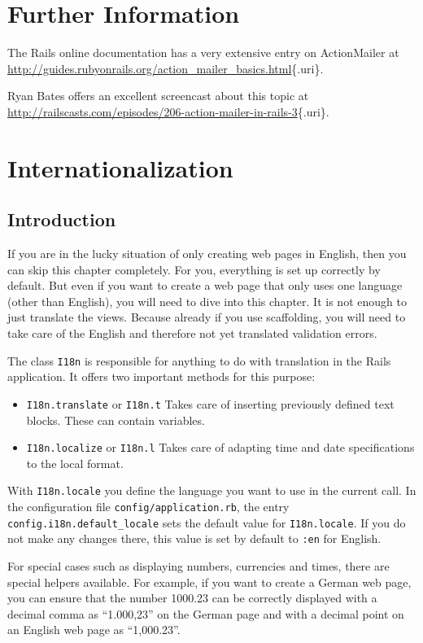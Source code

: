 \documentclass[a4paper]{book}
\newcommand{\chap}[1]{\newpage\thispagestyle{empty}\chapter{#1}\label{chap:\thechapter}}
\begin{document}
\chap{Further Information}\label{further-information}

The Rails online documentation has a very extensive entry on ActionMailer at \url{http://guides.rubyonrails.org/action_mailer_basics.html}\{.uri\}.

Ryan Bates offers an excellent screencast about this topic at \url{http://railscasts.com/episodes/206-action-mailer-in-rails-3}\{.uri\}.

\chap{Internationalization}\label{internationalization}

\section{Introduction}\label{introduction-4}

If you are in the lucky situation of only creating web pages in English, then you can skip this chapter completely. For you, everything is set up correctly by default. But even if you want to create a web page that only uses one language (other than English), you will need to dive into this chapter. It is not enough to just translate the views. Because already if you use scaffolding, you will need to take care of the English and therefore not yet translated validation errors.

The class \texttt{I18n} is responsible for anything to do with translation in the Rails application. It offers two important methods for this purpose:

\begin{itemize}
\itemsep1pt\parskip0pt
\item
  \texttt{I18n.translate} or \texttt{I18n.t} Takes care of inserting previously defined text blocks. These can contain variables.
\item
  \texttt{I18n.localize} or \texttt{I18n.l} Takes care of adapting time and date specifications to the local format.
\end{itemize}

With \texttt{I18n.locale} you define the language you want to use in the current call. In the configuration file \texttt{config/application.rb}, the entry \texttt{config.i18n.default\_locale} sets the default value for \texttt{I18n.locale}. If you do not make any changes there, this value is set by default to \texttt{:en} for English.

For special cases such as displaying numbers, currencies and times, there are special helpers available. For example, if you want to create a German web page, you can ensure that the number 1000.23 can be correctly displayed with a decimal comma as “1.000,23” on the German page and with a decimal point on an English web page as “1,000.23”.
\end{document}
